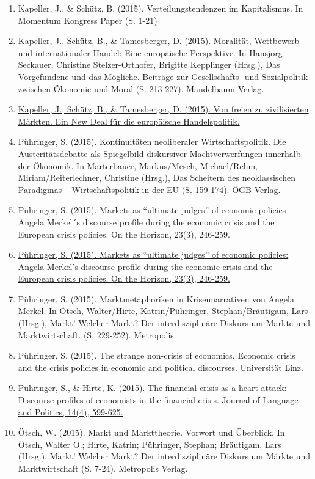 \begin{enumerate}
	 \item Kapeller, J., \& Schütz, B. (2015). Verteilungstendenzen im Kapitalismus. In Momentum Kongress Paper (S. 1-21)
	 \item Kapeller, J., Schütz, B., \& Tamesberger, D. (2015). Moralität, Wettbewerb und internationaler Handel: Eine europäische Perspektive. In Hansjörg Seckauer, Christine Stelzer-Orthofer, Brigitte Kepplinger (Hrsg.), Das Vorgefundene und das Mögliche. Beiträge zur Gesellschafts- und Sozialpolitik zwischen Ökonomie und Moral (S. 213-227). Mandelbaum Verlag.
	 \item \href{https://www.oegfe.at/wp-content/uploads/2015/07/OEGfE_Policy_Brief-2015.05_01-1.pdf}{Kapeller, J., Schütz, B., \& Tamesberger, D. (2015). Von freien zu zivilisierten Märkten. Ein New Deal für die europäische Handelspolitik.}
	 \item Pühringer, S. (2015). Kontinuitäten neoliberaler Wirtschaftspolitik. Die Austeritätsdebatte als Spiegelbild diskursiver Machtverwerfungen innerhalb der Ökonomik. In Marterbauer, Markus/Mesch, Michael/Rehm, Miriam/Reiterlechner, Christine (Hrsg.), Das Scheitern des neoklassischen Paradigmas – Wirtschaftspolitik in der EU (S. 159-174). ÖGB Verlag.
	 \item Pühringer, S. (2015). Markets as “ultimate judges” of economic policies -- Angela Merkel´s discourse profile during the economic crisis and the European crisis policies. On the Horizon, 23(3), 246-259.
	 \item \href{https://doi.org/10.1108/OTH-01-2015-0002}{Pühringer, S. (2015). Markets as “ultimate judges” of economic policies: Angela Merkel’s discourse profile during the economic crisis and the European crisis policies. On the Horizon, 23(3), 246-259.}
	 \item Pühringer, S. (2015). Marktmetaphoriken in Krisennarrativen von Angela Merkel. In Ötsch, Walter/Hirte, Katrin/Pühringer, Stephan/Bräutigam, Lars (Hrsg.), Markt! Welcher Markt? Der interdisziplinäre Diskurs um Märkte und Marktwirtschaft. (S. 229-252). Metropolis.
	 \item Pühringer, S. (2015). The strange non-crisis of economics. Economic crisis and the crisis policies in economic and political discourses. Universität Linz.
	 \item \href{https://doi.org/10.1075/jlp.14.4.06puh}{Pühringer, S., \& Hirte, K. (2015). The financial crisis as a heart attack: Discourse profiles of economists in the financial crisis. Journal of Language and Politics, 14(4), 599-625.}
	 \item Ötsch, W. (2015). Markt und Markttheorie. Vorwort und Überblick. In Ötsch, Walter O.; Hirte, Katrin; Pühringer, Stephan; Bräutigam, Lars (Hrsg.), Markt! Welcher Markt? Der interdisziplinäre Diskurs um Märkte und Marktwirtschaft (S. 7-24). Metropolis Verlag.

\end{enumerate}
